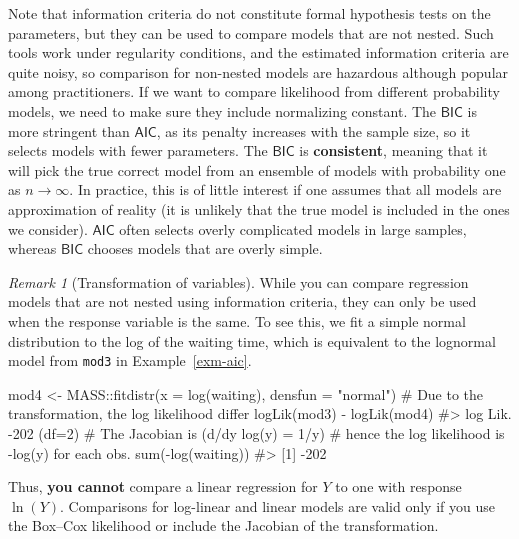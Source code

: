 \documentclass[
  11pt,
  letterpaper,
]{scrbook}
\newenvironment{Shaded}{\begin{snugshade}}{\end{snugshade}}
\newcommand{\AttributeTok}[1]{\textcolor[rgb]{0.40,0.45,0.13}{#1}}
\newcommand{\CommentTok}[1]{\textcolor[rgb]{0.37,0.37,0.37}{#1}}
\newcommand{\FunctionTok}[1]{\textcolor[rgb]{0.28,0.35,0.67}{#1}}
\newcommand{\NormalTok}[1]{\textcolor[rgb]{0.00,0.23,0.31}{#1}}
\newcommand{\OtherTok}[1]{\textcolor[rgb]{0.00,0.23,0.31}{#1}}
\newcommand{\SpecialCharTok}[1]{\textcolor[rgb]{0.37,0.37,0.37}{#1}}
\newcommand{\StringTok}[1]{\textcolor[rgb]{0.13,0.47,0.30}{#1}}
\theoremstyle{plain}
\theoremstyle{definition}
\theoremstyle{definition}
\theoremstyle{plain}
\theoremstyle{remark}
\newtheorem{refremark}{Remark}[chapter]
\begin{document}
Note that information criteria do not constitute formal hypothesis tests
on the parameters, but they can be used to compare models that are not
nested. Such tools work under regularity conditions, and the estimated
information criteria are quite noisy, so comparison for non-nested
models are hazardous although popular among practitioners. If we want to
compare likelihood from different probability models, we need to make
sure they include normalizing constant. The \(\mathsf{BIC}\) is more
stringent than \(\mathsf{AIC}\), as its penalty increases with the
sample size, so it selects models with fewer parameters. The
\(\mathsf{BIC}\) is \textbf{consistent}, meaning that it will pick the
true correct model from an ensemble of models with probability one as
\(n \to \infty\). In practice, this is of little interest if one assumes
that all models are approximation of reality (it is unlikely that the
true model is included in the ones we consider). \(\mathsf{AIC}\) often
selects overly complicated models in large samples, whereas
\(\mathsf{BIC}\) chooses models that are overly simple.

\begin{refremark}[Transformation of variables]
While you can compare regression models that are not nested using
information criteria, they can only be used when the response variable
is the same. To see this, we fit a simple normal distribution to the log
of the waiting time, which is equivalent to the lognormal model from
\texttt{mod3} in Example~\ref{exm-aic}.

\begin{Shaded}
\begin{Highlighting}[]
\NormalTok{mod4 }\OtherTok{\textless{}{-}}\NormalTok{ MASS}\SpecialCharTok{::}\FunctionTok{fitdistr}\NormalTok{(}\AttributeTok{x =} \FunctionTok{log}\NormalTok{(waiting), }\AttributeTok{densfun =} \StringTok{"normal"}\NormalTok{)}
\CommentTok{\# Due to the transformation, the log likelihood differ}
\FunctionTok{logLik}\NormalTok{(mod3) }\SpecialCharTok{{-}} \FunctionTok{logLik}\NormalTok{(mod4)}
\CommentTok{\#\textgreater{} \textquotesingle{}log Lik.\textquotesingle{} {-}202 (df=2)}
\CommentTok{\# The Jacobian is (d/dy log(y) = 1/y)}
\CommentTok{\# hence the log likelihood is {-}log(y) for each obs.}
\FunctionTok{sum}\NormalTok{(}\SpecialCharTok{{-}}\FunctionTok{log}\NormalTok{(waiting))}
\CommentTok{\#\textgreater{} [1] {-}202}
\end{Highlighting}
\end{Shaded}

Thus, \textbf{you cannot} compare a linear regression for \(Y\) to one
with response \(\ln(Y)\). Comparisons for log-linear and linear models
are valid only if you use the Box--Cox likelihood or include the
Jacobian of the transformation.

\label{rem-warning-transformation}

\end{refremark}
\end{document}
